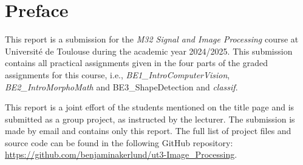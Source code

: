\section*{Preface}


This report is a submission for the \textit{M32 Signal and Image Processing} course at Université de Toulouse during the academic year 2024/2025.
This submission contains all practical assignments given in the four parts of the graded assignments for this course, i.e., \textit{BE1\_IntroComputerVision}, \textit{BE2\_IntroMorphoMath} and {BE3\_ShapeDetection} and \textit{classif}.

This report is a joint effort of the students mentioned on the title page and is submitted as a group project, as instructed by the lecturer.
The submission is made by email and contains only this report.
The full list of project files and source code can be found in the following GitHub repository: \url{https://github.com/benjaminakerlund/ut3-Image_Processing}.





